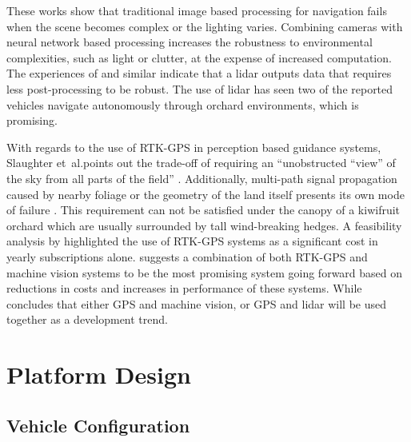 \documentclass[preprint,authoryear,12pt]{elsarticle}
\begin{document}
        These works show that traditional image based processing for navigation fails when the scene becomes complex or the lighting varies.
        Combining cameras with neural network based processing increases the robustness to environmental complexities, such as light or clutter, at the expense of increased computation.
        The experiences of \cite{Scarfe2012} and similar indicate that a lidar outputs data that requires less post-processing to be robust.
        The use of lidar has seen two of the reported vehicles navigate autonomously through orchard environments, which is promising.

        With regards to the use of RTK-GPS in perception based guidance systems, Slaughter et~al.\@ points out the trade-off of requiring an ``unobstructed ``view'' of the sky from all parts of the field'' \citep{Slaughter2008}.
        Additionally, multi-path signal propagation caused by nearby foliage or the geometry of the land itself presents its own mode of failure \citep{Durrant-Whyte2005}.
        This requirement can not be satisfied under the canopy of a kiwifruit orchard which are usually surrounded by tall wind-breaking hedges.
        A feasibility analysis by \cite{Pedersen2006} highlighted the use of RTK-GPS systems as a significant cost in yearly subscriptions alone.
        \cite{Torii2000} suggests a combination of both RTK-GPS and machine vision systems to be the most promising system going forward based on reductions in costs and increases in performance of these systems.
        While \cite{Li2009} concludes that either GPS and machine vision, or GPS and lidar will be used together as a development trend.


\section{Platform Design}

    \subsection{Vehicle Configuration}
    \label{sect:mechanical}
\end{document}
